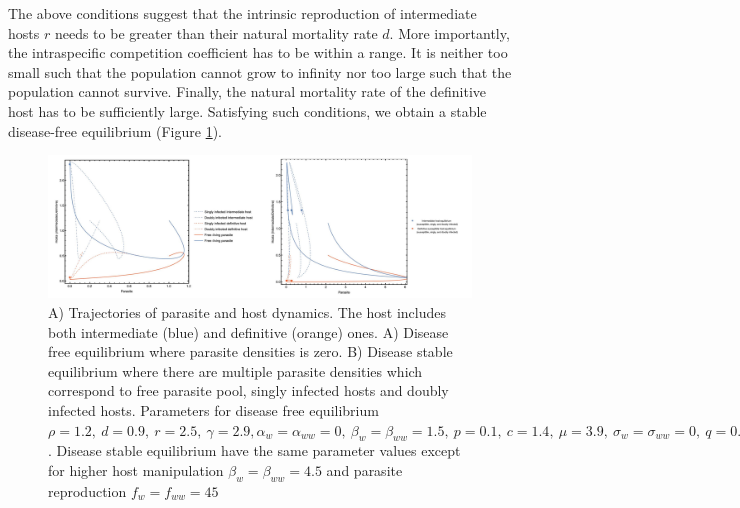 \documentclass[11pt]{article}
\begin{document}
The above conditions suggest that the intrinsic reproduction of intermediate hosts $r$ needs to be greater than their natural mortality rate $d$. 
More importantly, the intraspecific competition coefficient has to be within a range. 
It is neither too small such that the population cannot grow to infinity nor too large such that the population cannot survive. 
Finally, the natural mortality rate of the definitive host has to be sufficiently large. Satisfying such conditions, we obtain a stable disease-free equilibrium (Figure \ref{fig:ecotraject:nonlinear}).

\begin{figure}[!ht]
\includegraphics[width=\textwidth]{Figures/ecotraject_nonlinear.jpeg}
\caption{A) Trajectories of parasite and host dynamics. The host includes both intermediate (blue) and definitive (orange) ones. A) Disease free equilibrium where parasite densities is zero. B) Disease stable equilibrium where there are multiple parasite densities which correspond to free parasite pool, singly infected hosts and doubly infected hosts. Parameters for disease free equilibrium $\rho =  1.2, \ d = 0.9, \  r = 2.5, \ \gamma =  2.9, \alpha_w = \alpha_{ww} =  0, \ \beta_w = \beta_{ww} = 1.5, \ p = 0.1, \  c = 1.4, \ \mu = 3.9, \ \sigma_w = \sigma_{ww} = 0, \ q = 0.01, \ f_w = f_{ww} = 7.5, \ \delta = 0.9, \ k = 0.26$. Disease stable equilibrium have the same parameter values except for higher host manipulation $ \beta_w =  \beta_{ww} = 4.5$ and parasite reproduction $ f_w  = f_{ww} = 45$}
\label{fig:ecotraject:nonlinear}
\end{figure}
\end{document}
